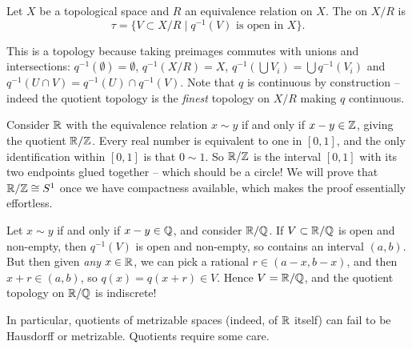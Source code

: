 \documentclass[a4paper]{scrartcl}
\begin{document}
\begin{definition}
    Let $X$ be a topological space and $R$ an equivalence relation on $X$. The  on $X/R$ is
    $$
    \tau = \{V \subset X/R \mid q^{-1}(V) \text{ is open in } X\}.
    $$
\end{definition}

This is a topology because taking preimages commutes with unions and intersections: $q^{-1}(\emptyset) = \emptyset$, $q^{-1}(X/R) = X$, $q^{-1}(\bigcup V_i) = \bigcup q^{-1}(V_i)$ and $q^{-1}(U \cap V) = q^{-1}(U) \cap q^{-1}(V)$. Note that $q$ is continuous by construction -- indeed the quotient topology is the \emph{finest} topology on $X/R$ making $q$ continuous.

\begin{example}
    Consider $\mathbb{R}$ with the equivalence relation $x \sim y$ if and only if $x - y \in \mathbb{Z}$, giving the quotient $\mathbb{R} / \mathbb{Z}$. Every real number is equivalent to one in $[0, 1]$, and the only identification within $[0, 1]$ is that $0 \sim 1$. So $\mathbb{R}/\mathbb{Z}$ is the interval $[0, 1]$ with its two endpoints glued together -- which should be a circle! We will prove that $\mathbb{R}/\mathbb{Z} \cong S^1$ once we have compactness available, which makes the proof essentially effortless.
\end{example}

\begin{example}
    Let $x \sim y$ if and only if $x - y \in \mathbb{Q}$, and consider $\mathbb{R} / \mathbb{Q}$. If $V \subset \mathbb{R}/\mathbb{Q}$ is open and non-empty, then $q^{-1}(V)$ is open and non-empty, so contains an interval $(a, b)$. But then given \emph{any} $x \in \mathbb{R}$, we can pick a rational $r \in (a - x, b - x)$, and then $x + r \in (a, b)$, so $q(x) = q(x + r) \in V$. Hence $V = \mathbb{R}/\mathbb{Q}$, and the quotient topology on $\mathbb{R}/\mathbb{Q}$ is indiscrete!

    In particular, quotients of metrizable spaces (indeed, of $\mathbb{R}$ itself) can fail to be Hausdorff or metrizable. Quotients require some care.
\end{example}
\end{document}
